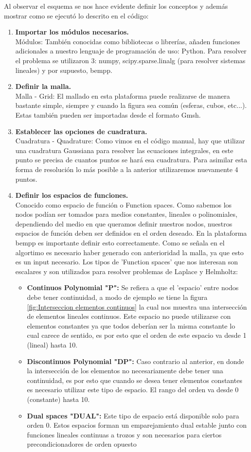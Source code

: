 \documentclass[11pt]{article}
\begin{document}
Al observar el esquema se nos hace evidente definir los conceptos y además mostrar como se ejecutó lo descrito en el código:
\begin{enumerate}
\item \textbf{Importar los módulos necesarios.}\\
Módulos: También conocidas como bibliotecas o librerías, añaden funciones adicionales a nuestro lenguaje de programación de uso: Python. Para resolver el problema se utilizaron 3: numpy, scipy.sparse.linalg (para resolver sistemas lineales) y por supuesto, bempp.
\item \textbf{Definir la malla.}\\Malla - Grid: El mallado en esta plataforma puede realizarse de manera bastante simple, siempre y cuando la figura sea común (esferas, cubos, etc...). Estas también pueden ser importadas desde el formato Gmsh.
\item \textbf{Establecer las opciones de cuadratura.}\\Cuadratura - Quadrature: Como vimos en el código manual, hay que utilizar una cuadratura Gaussiana para resolver las ecuaciones integrales, en este punto se precisa de cuantos puntos se hará esa cuadratura. Para asimilar esta forma de resolución lo más posible a la anterior utilizaremos nuevamente 4 puntos.
\item \textbf{Definir los espacios de funciones.}\\Conocido como espacio de función o Function spaces. Como sabemos los nodos podían ser tomados para medios constantes, lineales o polinomiales, dependiendo del medio en que queramos definir nuestros nodos, nuestros espacios de función deben ser definidos en el orden deseado. En la plataforma bempp es importante definir esto correctamente. Como se señala en el algortimo es necesario haber generado con anterioridad la malla, ya que esto es un input necesario. Los tipos de 'Function spaces' que nos interesan son escalares y son utilizados para resolver problemas de Laplace y Helmholtz:
\begin{itemize}
\item \textbf{Continuos Polynomial "P": } Se refiera a que el 'espacio' entre nodos debe tener continuidad, a modo de ejemplo se tiene la figura \ref{fig:Interseccion elementos continuos} la cual nos muestra una intersección de elementos lineales continuos. Este espacio no puede utilizarse con elementos constantes ya que todos deberían ser la misma constante lo cual carece de sentido, es por esto que el orden de este espacio va desde 1 (lineal) hasta 10.
\item \textbf{Discontinuos Polynomial "DP": }Caso contrario al anterior, en donde la intersección de los elementos no necesariamente debe tener una continuidad, es por esto que cuando se desea tener elementos constantes es necesario utilizar este tipo de espacio. El rango del orden va desde 0 (constante) hasta 10.
\item \textbf{Dual spaces "DUAL": }Este tipo de espacio está disponible solo para orden 0. Estos	 espacios forman un emparejamiento dual estable junto con funciones lineales continuas a trozos y son necesarios para ciertos precondicionadores de orden opuesto
\end{itemize}


\end{enumerate}
\end{document}
